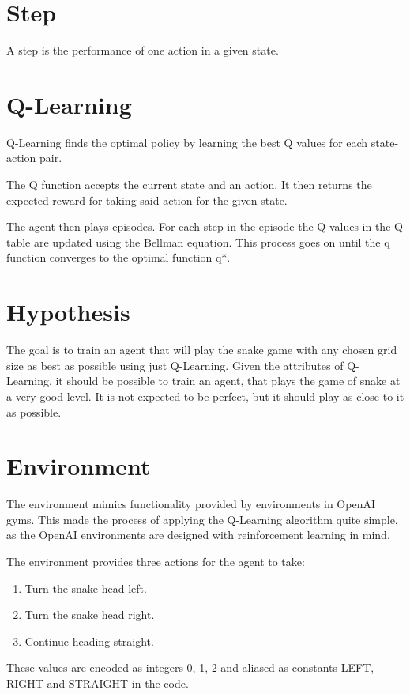 \documentclass[lettersize,journal]{IEEEtran}
\begin{document}
\section{Step}
A step is the performance of one action in a given state.



\section{Q-Learning}
Q-Learning finds the optimal policy by learning
the best Q values for each state-action pair.

The Q function accepts the current state and an action. It then
returns the expected reward for taking said action for the given
state.

The agent then plays episodes. For each step in the episode
the Q values in the Q table are updated using the Bellman
equation. This process goes on until the q function converges
to the optimal function q*.

\section{Hypothesis}
The goal is to train an agent that will play the snake game
with any chosen grid size as best as possible using just Q-Learning.
Given the attributes of Q-Learning, it should be possible to train
an agent, that plays the game of snake at a very good level. It
is not expected to be perfect, but it should play as close to it
as possible.


\section{Environment}
The environment mimics functionality provided by environments in
OpenAI gyms. This made the process of applying the Q-Learning
algorithm quite simple, as the OpenAI environments are designed
with reinforcement learning in mind.

The environment provides three actions for the agent to take:
\begin{enumerate}
    \item Turn the snake head left.
    \item Turn the snake head right.
    \item Continue heading straight.
\end{enumerate}
These values are encoded as integers 0, 1, 2 and aliased as
constants LEFT, RIGHT and STRAIGHT in the code.
\end{document}

